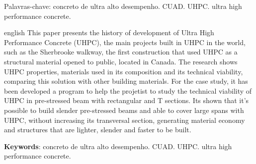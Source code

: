 \documentclass[
	12pt,				%
	openright,			%
	oneside,			%
	a4paper,			%
	chapter=TITLE,		%
	english,			%
	french,				%
	spanish,			%
	brazil				%
	]{abntex2}
\begin{document}
\begin{resumo}
 
 {Palavras-chave}: concreto de ultra alto desempenho. CUAD. UHPC. ultra high performance concrete.
 
\end{resumo}
\begin{resumo}[Abstract]
 \begin{otherlanguage*}{english}
     This paper presents the history of development of Ultra High Performance Concrete (UHPC), the main projects built in UHPC in the world, such as the Sherbrooke walkway, the first construction that used UHPC as a structural material opened to public, located in Canada. The research shows UHPC properties, materials used in its composition and its technical viability, comparing this solution with other building materials. For the case study, it has been developed a program to help the projetist to study the technical viability of UHPC in pre-stressed beam with rectangular and T sections. Its shown that it's possible to build slender pre-stressed beams and able to cover large spans with UHPC, without increasing its transversal section, generating material economy and structures that are lighter, slender and faster to be built.
   \vspace{\onelineskip}
   
 
   \noindent 
   \textbf{Keywords}: concreto de ultra alto desempenho. CUAD. UHPC. ultra high performance concrete.
 \end{otherlanguage*}
\end{resumo}

 

  

\listoffigures*
\cleardoublepage
\end{document}
